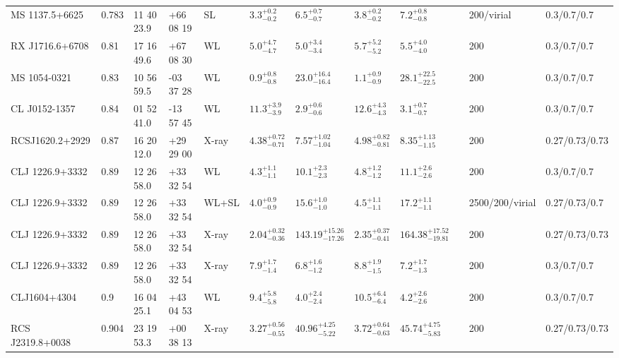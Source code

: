 \begin{landscape}
\begin{center}
{\begin{longtable}{llllllllllll}
MS 1137.5+6625 & 0.783 & 11 40 23.9 & +66 08 19 & SL & ${3.3}^{+0.2}_{-0.2}$ & ${6.5}^{+0.7}_{-0.7}$ & ${3.8}^{+0.2}_{-0.2}$ & ${7.2}^{+0.8}_{-0.8}$ & \citet{CO07.1} & 200/virial & 0.3/0.7/0.7 \\
RX J1716.6+6708 & 0.81 & 17 16 49.6 & +67 08 30 & WL & ${5.0}^{+4.7}_{-4.7}$ & ${5.0}^{+3.4}_{-3.4}$ & ${5.7}^{+5.2}_{-5.2}$ & ${5.5}^{+4.0}_{-4.0}$ & \citet{SE14.1} & 200 & 0.3/0.7/0.7 \\
MS 1054-0321 & 0.83 & 10 56 59.5 & -03 37 28 & WL & ${0.9}^{+0.8}_{-0.8}$ & ${23.0}^{+16.4}_{-16.4}$ & ${1.1}^{+0.9}_{-0.9}$ & ${28.1}^{+22.5}_{-22.5}$ & \citet{SE14.1} & 200 & 0.3/0.7/0.7 \\
CL J0152-1357 & 0.84 & 01 52 41.0 & -13 57 45 & WL & ${11.3}^{+3.9}_{-3.9}$ & ${2.9}^{+0.6}_{-0.6}$ & ${12.6}^{+4.3}_{-4.3}$ & ${3.1}^{+0.7}_{-0.7}$ & \citet{SE14.1} & 200 & 0.3/0.7/0.7 \\
RCSJ1620.2+2929 & 0.87 & 16 20 12.0 & +29 29 00 & X-ray & ${4.38}^{+0.72}_{-0.71}$ & ${7.57}^{+1.02}_{-1.04}$ & ${4.98}^{+0.82}_{-0.81}$ & ${8.35}^{+1.13}_{-1.15}$ & \citet{BA14.1} & 200 & 0.27/0.73/0.73 \\
CLJ 1226.9+3332 & 0.89 & 12 26 58.0 & +33 32 54 & WL & ${4.3}^{+1.1}_{-1.1}$ & ${10.1}^{+2.3}_{-2.3}$ & ${4.8}^{+1.2}_{-1.2}$ & ${11.1}^{+2.6}_{-2.6}$ & \citet{SE14.1} & 200 & 0.3/0.7/0.7 \\
CLJ 1226.9+3332 & 0.89 & 12 26 58.0 & +33 32 54 & WL+SL & ${4.0}^{+0.9}_{-0.9}$ & ${15.6}^{+1.0}_{-1.0}$ & ${4.5}^{+1.1}_{-1.1}$ & ${17.2}^{+1.1}_{-1.1}$ & \citet{ME14.1} & 2500/200/virial & 0.27/0.73/0.7 \\
CLJ 1226.9+3332 & 0.89 & 12 26 58.0 & +33 32 54 & X-ray & ${2.04}^{+0.32}_{-0.36}$ & ${143.19}^{+15.26}_{-17.26}$ & ${2.35}^{+0.37}_{-0.41}$ & ${164.38}^{+17.52}_{-19.81}$ & \citet{BA14.1} & 200 & 0.27/0.73/0.73 \\
CLJ 1226.9+3332 & 0.89 & 12 26 58.0 & +33 32 54 & X-ray & ${7.9}^{+1.7}_{-1.4}$ & ${6.8}^{+1.6}_{-1.2}$ & ${8.8}^{+1.9}_{-1.5}$ & ${7.2}^{+1.7}_{-1.3}$ & \citet{MA07.1} & 200 & 0.3/0.7/0.7 \\
CLJ1604+4304 & 0.9 & 16 04 25.1 & +43 04 53 & WL & ${9.4}^{+5.8}_{-5.8}$ & ${4.0}^{+2.4}_{-2.4}$ & ${10.5}^{+6.4}_{-6.4}$ & ${4.2}^{+2.6}_{-2.6}$ & \citet{SE14.1} & 200 & 0.3/0.7/0.7 \\
RCS J2319.8+0038 & 0.904 & 23 19 53.3 & +00 38 13 & X-ray & ${3.27}^{+0.56}_{-0.55}$ & ${40.96}^{+4.25}_{-5.22}$ & ${3.72}^{+0.64}_{-0.63}$ & ${45.74}^{+4.75}_{-5.83}$ & \citet{BA14.1} & 200 & 0.27/0.73/0.73 \\

\end{longtable}}
\end{center}
\end{landscape}
